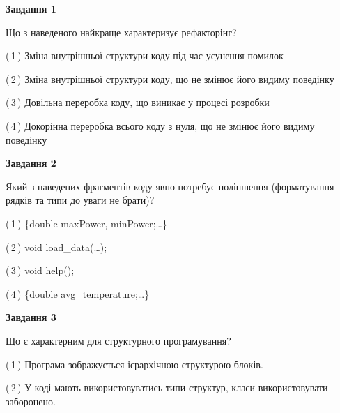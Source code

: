 \documentclass[10pt, ukrainian]{article}
\begin{document}
{
\begin {large}
{\begin {center}\textbf{Завдання 1}\end {center}}\par
Що з наведеного найкраще характеризує рефакторінг?\par
\vspace{2mm}



(\,1\,) Зміна внутрішньої структури коду під час усунення помилок%



(\,2\,) Зміна внутрішньої структури коду, що не змінює його видиму поведінку%



(\,3\,) Довільна переробка коду, що виникає у процесі розробки%



(\,4\,) Докорінна переробка всього коду з нуля,  що не змінює його видиму поведінку%


{\begin {center}\textbf{Завдання 2}\end {center}}\par
Який з наведених фрагментів коду явно потребує поліпшення (форматування рядків та типи до уваги не брати)?\par
\vspace{2mm}



(\,1\,) \{double maxPower, minPower;…\} %



(\,2\,) void load\_data(…);%



(\,3\,) void help();%



(\,4\,) \{double avg\_temperature;…\} %


{\begin {center}\textbf{Завдання 3}\end {center}}\par
Що є характерним для структурного програмування?\par
\vspace{2mm}



(\,1\,) Програма зображується ієрархічною структурою блоків.%



(\,2\,) У коді мають використовуватись типи структур, класи використовувати заборонено. %




\end{large}}
\end{document}
